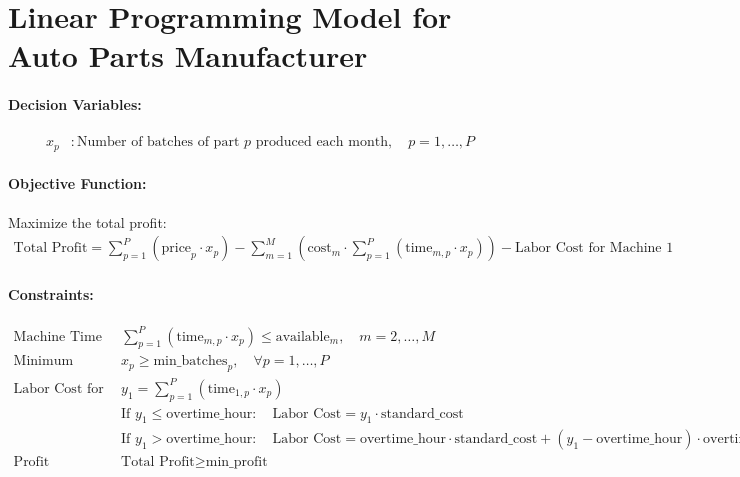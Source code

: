 \documentclass{article}
\begin{document}
\section*{Linear Programming Model for Auto Parts Manufacturer}

\paragraph{Decision Variables:}
\begin{align*}
x_p &: \text{Number of batches of part } p \text{ produced each month}, \quad p = 1, \ldots, P
\end{align*}

\paragraph{Objective Function:}
Maximize the total profit:
\begin{align*}
\text{Total Profit} = \sum_{p=1}^{P} (\text{price}_p \cdot x_p) - \sum_{m=1}^{M} \left(\text{cost}_m \cdot \sum_{p=1}^{P} (\text{time}_{m,p} \cdot x_p) \right) - \text{Labor Cost for Machine 1}
\end{align*}

\paragraph{Constraints:}
\begin{align*}
\text{Machine Time Availability:} \quad & \sum_{p=1}^{P} (\text{time}_{m,p} \cdot x_p) \leq \text{available}_m, \quad m = 2, \ldots, M \\
\text{Minimum Production Requirement:} \quad & x_p \geq \text{min_batches}_p, \quad \forall p = 1, \ldots, P \\
\text{Labor Cost for Machine 1:} \quad & y_1 = \sum_{p=1}^{P} (\text{time}_{1,p} \cdot x_p) \\
& \text{If } y_1 \leq \text{overtime_hour}: \quad \text{Labor Cost} = y_1 \cdot \text{standard_cost} \\
& \text{If } y_1 > \text{overtime_hour}: \quad \text{Labor Cost} = \text{overtime_hour} \cdot \text{standard_cost} + (y_1 - \text{overtime_hour}) \cdot \text{overtime_cost} \\
\text{Profit Constraint:} \quad & \text{Total Profit} \geq \text{min_profit}
\end{align*}
\end{document}
